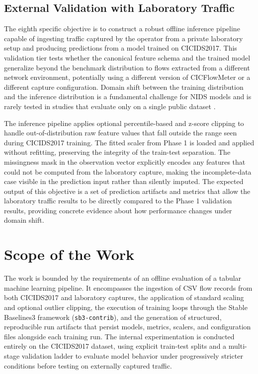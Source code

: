 \subsection{External Validation with Laboratory Traffic}
The eighth specific objective is to construct a robust offline inference pipeline capable of ingesting traffic captured by the operator from a private laboratory setup and producing predictions from a model trained on CICIDS2017. This validation tier tests whether the canonical feature schema and the trained model generalize beyond the benchmark distribution to flows extracted from a different network environment, potentially using a different version of CICFlowMeter or a different capture configuration. Domain shift between the training distribution and the inference distribution is a fundamental challenge for NIDS models and is rarely tested in studies that evaluate only on a single public dataset \parencite{Apruzzese2022CrossEvaluationNIDS,Layeghy2023CrossDomainNIDS}.

The inference pipeline applies optional percentile-based and z-score clipping to handle out-of-distribution raw feature values that fall outside the range seen during CICIDS2017 training. The fitted scaler from Phase 1 is loaded and applied without refitting, preserving the integrity of the train-test separation. The missingness mask in the observation vector explicitly encodes any features that could not be computed from the laboratory capture, making the incomplete-data case visible in the prediction input rather than silently imputed. The expected output of this objective is a set of prediction artifacts and metrics that allow the laboratory traffic results to be directly compared to the Phase 1 validation results, providing concrete evidence about how performance changes under domain shift.

\section{Scope of the Work}
The work is bounded by the requirements of an offline evaluation of a tabular machine learning pipeline. It encompasses the ingestion of CSV flow records from both CICIDS2017 and laboratory captures, the application of standard scaling and optional outlier clipping, the execution of training loops through the Stable Baselines3 framework (\texttt{sb3-contrib}), and the generation of structured, reproducible run artifacts that persist models, metrics, scalers, and configuration files alongside each training run. The internal experimentation is conducted entirely on the CICIDS2017 dataset, using explicit train-test splits and a multi-stage validation ladder to evaluate model behavior under progressively stricter conditions before testing on externally captured traffic.


